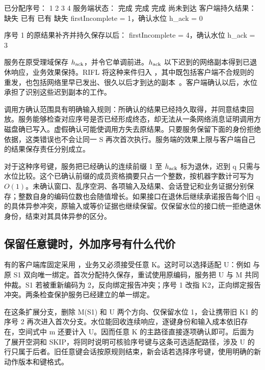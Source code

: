 \begin{BookCode}
已分配序号：     1       2       3       4
服务端状态：     完成    完成    完成    尚未到达
客户端持久结果： 缺失    已有    已有    缺失
firstIncomplete = 1，确认水位 h_ack = 0

序号 1 的原结果补齐并持久保存以后：
firstIncomplete = 4，确认水位 h_ack = 3
\end{BookCode}


服务在原受理域保存 $h_{\rm ack}$，并令它单调前进。$h_{\rm ack}$ 以下迟到的网络副本得到已退休响应，业务效果保持。RIFL 将这种来件归入 ，其中既包括客户端不合规则的重发，也包括网络里早已发出、很久以后才到达的副本~\cite{rifl}。客户端确认以后，水位承担了识别这些迟到副本的工作。

调用方确认范围具有明确输入规则：所确认的结果已经持久取得，并同意结束回放。服务能够检查对应序号是否已经形成终态，却无法从一条网络消息证明调用方磁盘确已写入。虚假确认可能使调用方失去原结果。只要服务保留下面的身份拒绝依据，这类错误也不会让同一 S 再次首次执行。服务端的效果上限与客户端自己的结果保存责任分别成立。

对于这种序号键，服务把已经确认的连续前缀 1 至 $h_{\rm ack}$ 标为退休，迟到 q 只需与水位比较。这个已确认前缀的成员资格摘要只占一个整数，按机器字数计可写为 $O(1)$。未确认窗口、乱序空洞、各项输入及结果、会话登记和业务证据分别保存；整数自身的编码位数也会随值增长。如果接口在退休后继续承诺报告每个旧 q 的具体异参冲突，原输入或等价证据也继续保留。仅保留水位的接口统一拒绝退休身份，结束对其具体异参的区分。

\subsection*{保留任意键时，外加序号有什么代价}

有的客户端库固定采用 ，业务又必须接受任意 K。这时可以选择适配 U：例如  与原 S1 双向唯一绑定。首次分配持久保存，重试使用原编码，服务把 U 与 M 共同仲裁。S1 若被重新编码为 2，反向绑定报告冲突；序号 1 改指 K2，正向绑定报告冲突。两条检查保护服务已经建立的单一绑定。


在这条扩展分支，删除 M(S1) 和 U 两个方向、仅保留水位 1，会让携带旧 K1 的序号 2 再次进入首次分支。水位能回收连续响应，逐键身份和输入成本依旧存在，空间式中 m 还要计入 U。因而任意 K 的主路径直接逐项确认即可。后面为了展开空洞和 SKIP，将同时说明可核验序号键与这条可选适配路径，涉及 U 的行只属于后者。旧任意键会话按原规则结束，新会话若选择序号键，使用明确的新动作版本和键格式。

